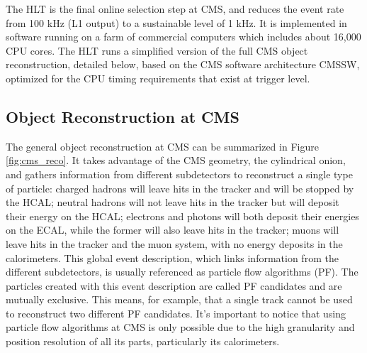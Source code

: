 The HLT is the final online selection step at CMS, and reduces the event rate from 100 kHz (L1 output) to a sustainable level of 1 kHz. 
It is implemented in software running on a farm of commercial computers which includes about 16,000 CPU cores. 
The HLT runs a simplified version of the full CMS object reconstruction, detailed below, based on the CMS software architecture CMSSW, optimized for the CPU timing requirements that exist at trigger level. 


\subsection{Object Reconstruction at CMS}

The general object reconstruction at CMS can be summarized in Figure \ref{fig:cms_reco}. 
It takes advantage of the CMS geometry, the cylindrical onion, and gathers information from different subdetectors to reconstruct a single type of particle: charged hadrons will leave hits in the tracker and will be stopped by the HCAL; neutral hadrons will not leave hits in the tracker but will deposit their energy on the HCAL; electrons and photons will both deposit their energies on the ECAL, while the former will also leave hits in the tracker; muons will leave hits in the tracker and the muon system, with no energy deposits in the calorimeters. 
This global event description, which links information from the different subdetectors, is usually referenced as particle flow algorithms (PF). 
The particles created with this event description are called PF candidates and are mutually exclusive. 
This means, for example, that a single track cannot be used to reconstruct two different PF candidates.
It's important to notice that using particle flow algorithms at CMS is only possible due to the high granularity and position resolution of all its parts, particularly its calorimeters. 

